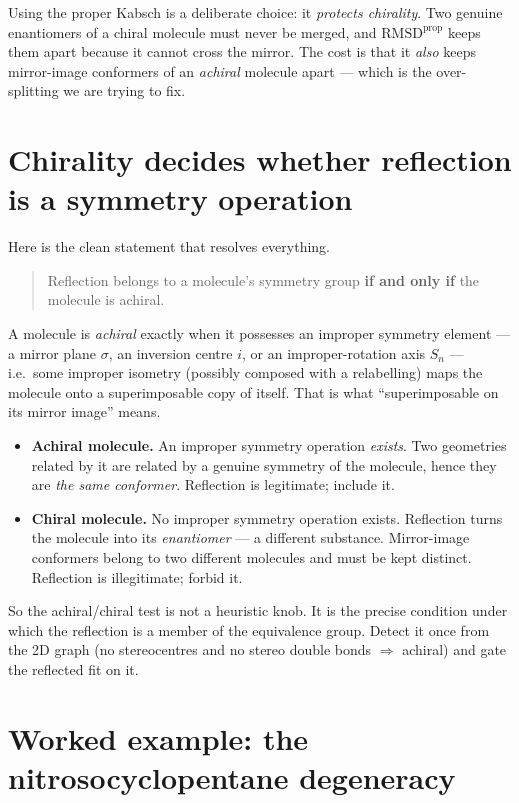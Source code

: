 \documentclass[11pt]{article}
\newcommand{\rmsd}{\mathrm{RMSD}}
\begin{document}
Using the proper Kabsch is a deliberate choice: it \emph{protects chirality}.
Two genuine enantiomers of a chiral molecule must never be merged, and
$\rmsd^{\text{prop}}$ keeps them apart because it cannot cross the mirror.
The cost is that it \emph{also} keeps mirror-image conformers of an
\emph{achiral} molecule apart --- which is the over-splitting we are trying to
fix.

\section{Chirality decides whether reflection is a symmetry operation}

Here is the clean statement that resolves everything.

\begin{quote}
Reflection belongs to a molecule's symmetry group \textbf{if and only if} the
molecule is achiral.
\end{quote}

A molecule is \emph{achiral} exactly when it possesses an improper symmetry
element --- a mirror plane $\sigma$, an inversion centre $i$, or an
improper-rotation axis $S_n$ --- i.e.\ some improper isometry (possibly composed
with a relabelling) maps the molecule onto a superimposable copy of itself.
That is what ``superimposable on its mirror image'' means.

\begin{itemize}
  \item \textbf{Achiral molecule.} An improper symmetry operation
        \emph{exists}. Two geometries related by it are related by a genuine
        symmetry of the molecule, hence they are \emph{the same conformer}.
        Reflection is legitimate; include it.
  \item \textbf{Chiral molecule.} No improper symmetry operation exists.
        Reflection turns the molecule into its \emph{enantiomer} --- a
        different substance. Mirror-image conformers belong to two different
        molecules and must be kept distinct. Reflection is illegitimate;
        forbid it.
\end{itemize}

So the achiral/chiral test is not a heuristic knob. It is the precise condition
under which the reflection is a member of the equivalence group. Detect it once
from the 2D graph (no stereocentres and no stereo double bonds
$\Rightarrow$ achiral) and gate the reflected fit on it.

\section{Worked example: the nitrosocyclopentane degeneracy}
\end{document}

